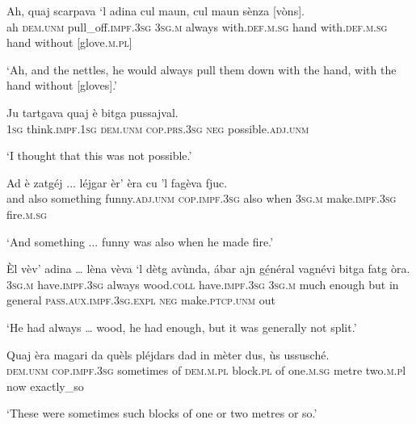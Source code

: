 \begin{linenumbers}
\gll  Ah, quaj scarpava `l adina cul maun, cul maun sènza [vòns].  \\
ah  \textsc{dem.unm} pull\_off.\textsc{impf.3sg} \textsc{3sg.m} always with.\textsc{def.m.sg} hand with.\textsc{def.m.sg} hand without [glove.\textsc{m.pl}]  \\
\end{linenumbers}
\medskip
\glt `Ah, and the nettles, he would always pull them down with the hand, with the hand without [gloves].'
\medskip

\begin{linenumbers}
\gll  Ju tartgava quaj è bitga pussajval.  \\
 \textsc{1sg} think.\textsc{impf.1sg} \textsc{dem.unm} \textsc{cop.prs.3sg} \textsc{neg} possible.\textsc{adj.unm}  \\ 
\end{linenumbers} 
\medskip
\glt `I thought that this was not possible.'
\medskip

\begin{linenumbers}
\gll  Ad è zatgéj ... léjgar èr’ èra cu 'l fagèva fjuc.  \\
 and also something {} funny.\textsc{adj.unm} \textsc{cop.impf.3sg} also when \textsc{3sg.m} make.\textsc{impf.3sg} fire.\textsc{m.sg} \\
\end{linenumbers}
\medskip
\glt `And something ... funny was also when he made fire.'
\medskip

\begin{linenumbers}
\gll Èl vèv’ adina … lèna vèva `l dètg avùnda, ábar ajn gé̱néral vagnévi bitga fatg òra. \\
 \textsc{3sg.m} have.\textsc{impf.3sg} always {} wood.\textsc{coll} have.\textsc{impf.3sg} \textsc{3sg.m} much enough but in general \textsc{pass.aux.impf.3sg.expl} \textsc{neg} make.\textsc{ptcp.unm} out  \\
\end{linenumbers}
\medskip
\glt `He had always … wood, he  had enough, but it was generally not split.'
\medskip

\begin{linenumbers}
\gll  Quaj èra magari da quèls pléjdars dad in mèter dus, ùs ussusché. \\
 \textsc{dem.unm} \textsc{cop.impf.3sg} sometimes of \textsc{dem.m.pl} block.\textsc{pl} of one.\textsc{m.sg} metre two.\textsc{m.p}l now exactly\_so  \\
\end{linenumbers}
\medskip
\glt `These were sometimes such blocks of one or two metres or so.'
\medskip

